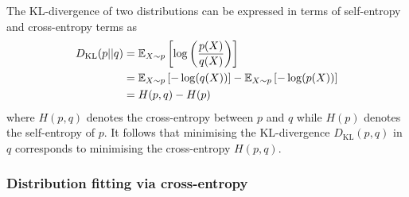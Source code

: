 \documentclass[11pt]{article}
\begin{document}
\begin{appendices}
The KL-divergence of two distributions can be expressed in terms of self-entropy and cross-entropy terms as
\begin{align*}
    D_{\text{KL}}(p||q)
    &=
    \mathbb{E}_{X\sim p}\left[\log\left(\frac{p(X)}{q(X)}\right)\right]\\
    &=
    \mathbb{E}_{X\sim p}\left[-\log(q(X))\right]-\mathbb{E}_{X\sim p}\left[-\log(p(X))\right]\\
    &=
    H(p,q)-H(p)
\end{align*}
where $H(p,q)$ denotes the cross-entropy between $p$ and $q$ while $H(p)$ denotes the self-entropy of $p$. It follows that minimising the KL-divergence $D_{\text{KL}}(p,q)$ in $q$ corresponds to minimising the cross-entropy $H(p,q)$.

\subsubsection{Distribution fitting via cross-entropy}
\label{subsubsec:dist_fit_CE}


\end{appendices}
\end{document}
